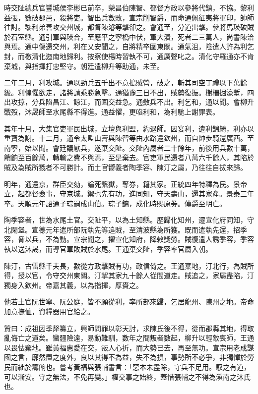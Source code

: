 \begin{pinyinscope}
時交阯總兵官豐城侯李彬已前卒，榮昌伯陳智、都督方政以參將代鎮，不協。黎利益張，數破郡邑，殺將吏。智出兵數敗，宣宗削智爵，而命通佩征夷將軍印，帥師往討。黎利弟善攻交州城，都督陳濬等擊卻之。會通至，分道出擊。參將馬瑛破賊於石室縣。通引軍與瑛合，至應平之寧橋中伏，軍大潰，死者二三萬人，尚書陳洽與焉。通中傷還交州，利在乂安聞之，自將精卒圍東關。通氣沮，陰遣人許為利乞封，而檄清化迤南地歸利。按察使楊時習執不可，通厲聲叱之。清化守羅通亦不肯棄城，與指揮打忠堅守。朝廷遣柳升等助通，未至。

二年二月，利攻城。通以勁兵五千出不意搗賊營，破之，斬其司空丁禮以下萬餘級。利惶懼欲走，諸將請乘勝急擊。通猶豫三日不出，賊勢復振。樹柵掘濠塹，四出攻掠，分兵陷昌江、諒江，而圍交益急。通斂兵不出。利乞和，通以聞。會柳升戰歿，沐晟師至水尾縣不得進。通益懼，更啗利和，為利馳上謝罪表。

其年十月，大集官吏軍民出城，立壇與利盟，約退師。因宴利，遺利錦綺，利亦以重寶為謝。十二月，通令太監山壽與陳智等由水路還欽州，而自帥步騎還廣西。至南寧，始以聞。會廷議厭兵，遂棄交阯。交阯內屬者二十餘年，前後用兵數十萬，饋餉至百餘萬，轉輸之費不與焉，至是棄去。官吏軍民還者八萬六千餘人，其陷於賊及為賊所戮者不可勝計。而土官嚮義者陶季容、陳汀之屬，乃往往自拔來歸。

明年，通還京，群臣交劾，論死繫獄，奪券，籍其家。正統四年特釋為民。景帝立，起都督僉事，守京城。禦也先有功，進同知，守天壽山，還其家產。景泰三年卒。天順元年詔通子琮嗣成山伯。琮子鏞，成化時賜原券。傳爵至明亡。

陶季容者，世為水尾土官。交阯平，以為土知縣。歷歸化知州，遷宣化府同知，守北閑堡。宣德元年遣所部阮執先等追賊，至清波縣為所獲。既而遣執先還，招季容，脅以兵，不為動。宣宗聞之，擢宣化知府，降敕獎勞。賊復遣人誘季容，季容執以送沐晟，而導官軍敗賊於水尾。王通棄交阯，季容率官屬入朝。

陳汀，古雷縣千夫長，數從方政擊賊有功，政信倚之。王通棄地，汀北行，為賊所得，授以官，令守交州東關。汀挈其家九十餘人從間道走。賊追之，家屬盡陷，汀獨身入欽州。帝嘉其義，以為指揮，厚賚之。

他若土官阮世寧、阮公庭，皆不願從利，率所部來歸，乞居龍州、陳州之地。帝命加意撫恤，資糧器用官給之。

贊曰：成祖因季犛纂立，興師問罪以彰天討，求陳氏後不得，從而郡縣其地，得取亂侮亡之道矣。蠻疆險遠，易動難馴，數年之間叛者數起，柳升以輕敵喪師，王通以畏怯棄地。雖黃福惠愛在交，叛人心折，而大勢已去，再至無功。宣宗用老成謀國之言，廓然置之度外，良以其得不為益，失不為損，事勢所不必爭，非獨憚於勞民而絀於籌餉也。嘗考黃福與張輔書言：「惡本未盡除，守兵不足用。馭之有道，可以漸安。守之無法，不免再變。」權交事之始終，蓋惜張輔之不得為滇南之沐氏也。


\end{pinyinscope}